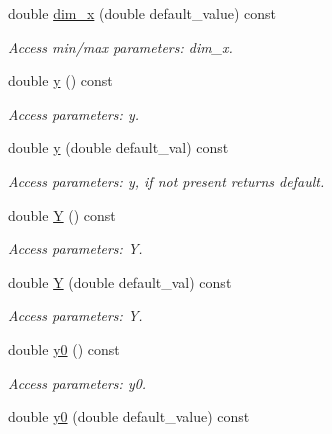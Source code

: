 \begin{DoxyCompactItemize}
double \hyperlink{struct_d_d4hep_1_1_x_m_l_1_1_dimension_aaad1017a023c4ac317d9e2cce0e76df7}{dim\_\-x} (double default\_\-value) const 
\begin{DoxyCompactList}\small\item\em Access min/max parameters: dim\_\-x. \item\end{DoxyCompactList}\item 
double \hyperlink{struct_d_d4hep_1_1_x_m_l_1_1_dimension_a882936e0dde2b0466f37f96c637177a0}{y} () const 
\begin{DoxyCompactList}\small\item\em Access parameters: y. \item\end{DoxyCompactList}\item 
double \hyperlink{struct_d_d4hep_1_1_x_m_l_1_1_dimension_a8182d9d03ae35d8cc594f2086e5c3af5}{y} (double default\_\-val) const 
\begin{DoxyCompactList}\small\item\em Access parameters: y, if not present returns default. \item\end{DoxyCompactList}\item 
double \hyperlink{struct_d_d4hep_1_1_x_m_l_1_1_dimension_a705919dff100963148b1b47765e1f553}{Y} () const 
\begin{DoxyCompactList}\small\item\em Access parameters: Y. \item\end{DoxyCompactList}\item 
double \hyperlink{struct_d_d4hep_1_1_x_m_l_1_1_dimension_ad748751b2959317aaa8fc96eec62839d}{Y} (double default\_\-val) const 
\begin{DoxyCompactList}\small\item\em Access parameters: Y. \item\end{DoxyCompactList}\item 
double \hyperlink{struct_d_d4hep_1_1_x_m_l_1_1_dimension_a99ed1d277f52c51439673394d6002877}{y0} () const 
\begin{DoxyCompactList}\small\item\em Access parameters: y0. \item\end{DoxyCompactList}\item 
double \hyperlink{struct_d_d4hep_1_1_x_m_l_1_1_dimension_a90b3314f990f3f5a17fa678c37f649a5}{y0} (double default\_\-value) const 

\end{DoxyCompactItemize}
